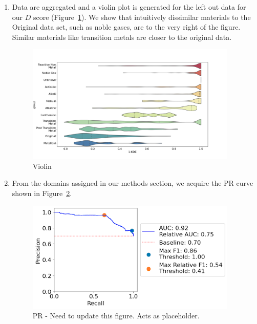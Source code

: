 \begin{enumerate}
    \begin{enumerate}

        \item Data are aggregated and a violin plot is generated for the left out data for our $D$ score (Figure~\ref{diffusion_chemical}). We show that intuitively dissimilar materials to the Original data set, such as noble gases, are to the very right of the figure. Similar materials like transition metals are closer to the original data.

        \begin{figure}[H]
        \centering
        \includegraphics[width=0.95\textwidth]{figures/diffusion_chemical.png}
        \caption{Violin}
        \label{diffusion_chemical}
        \end{figure}

        \item From the domains assigned in our methods section, we acquire the PR curve shown in Figure~\ref{diffusion_chemical_pr}.

        \begin{figure}[H]
        \centering
        \includegraphics[width=0.95\textwidth]{figures/diffusion_chemical_pr.png}
        \caption{PR - Need to update this figure. Acts as placeholder.}
        \label{diffusion_chemical_pr}
        \end{figure}
        

\end{enumerate}
\end{enumerate}
